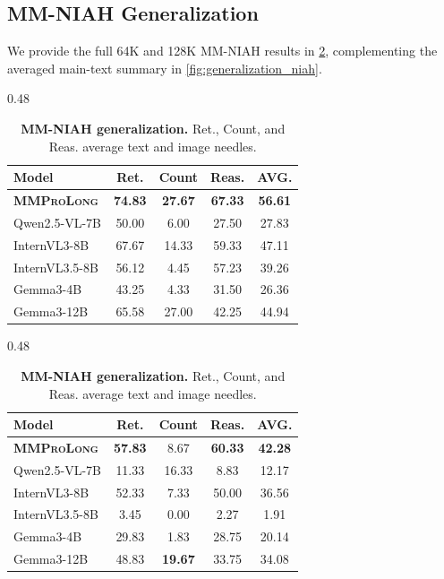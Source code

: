 \documentclass{llmxive}
\providecommand{\modelname}{\textsc{\textbf{MMProLong}}\xspace}
\begin{document}
{{{{{\subsection{MM-NIAH Generalization}
\label{app:complementary_experiment_results:generalization_niah}
We provide the full 64K and 128K MM-NIAH results in \cref{tab:generalization_niah}, complementing the averaged main-text summary in \cref{fig:generalization_niah}.

\begin{table}[!htbp]
\centering
\scriptsize
\captionsetup[subtable]{font=footnotesize,labelformat=parens,justification=centering,skip=1pt}

\begin{subtable}{0.48\textwidth}
 \centering
 \caption{\textbf{64K MM-NIAH}}

 \begin{tabular*}{\linewidth}{@{\extracolsep{\fill}}lcccc@{}}
 \toprule
 \textbf{Model} & Ret. & Count & Reas. & AVG. \\
 \midrule
 \modelname & \textbf{74.83} & \textbf{27.67} & \textbf{67.33} & \textbf{56.61} \\
 Qwen2.5-VL-7B & 50.00 & 6.00 & 27.50 & 27.83 \\
 \midrule
 InternVL3-8B & 67.67 & 14.33 & 59.33 & 47.11 \\
 InternVL3.5-8B & 56.12 & 4.45 & 57.23 & 39.26 \\
 Gemma3-4B & 43.25 & 4.33 & 31.50 & 26.36 \\
 Gemma3-12B & 65.58 & 27.00 & 42.25 & 44.94 \\
 \bottomrule
 \end{tabular*}
\end{subtable}
\hfill
\begin{subtable}{0.48\textwidth}
 \centering
 \caption{\textbf{128K MM-NIAH}}

 \begin{tabular*}{\linewidth}{@{\extracolsep{\fill}}lcccc@{}}
 \toprule
 \textbf{Model} & Ret. & Count & Reas. & AVG. \\
 \midrule
 \modelname & \textbf{57.83} & 8.67 & \textbf{60.33} & \textbf{42.28} \\
 Qwen2.5-VL-7B & 11.33 & 16.33 & 8.83 & 12.17 \\
 \midrule
 InternVL3-8B & 52.33 & 7.33 & 50.00 & 36.56 \\
 InternVL3.5-8B & 3.45 & 0.00 & 2.27 & 1.91 \\
 Gemma3-4B & 29.83 & 1.83 & 28.75 & 20.14 \\
 Gemma3-12B & 48.83 & \textbf{19.67} & 33.75 & 34.08 \\
 \bottomrule
 \end{tabular*}
\end{subtable}
\caption{\textbf{MM-NIAH generalization.} Ret., Count, and Reas. average text and image needles.}
\label{tab:generalization_niah}
\end{table}

}}}}}
\end{document}
